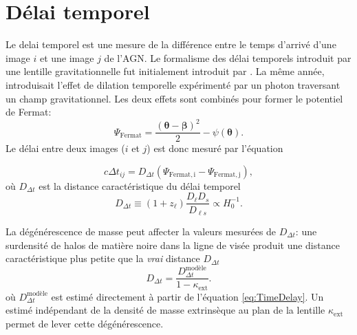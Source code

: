 \documentclass[times,10pt,twocolumn]{article}
\begin{document}

\section{Délai temporel}\label{sec:delay}
Le delai temporel est une mesure de la différence entre le temps d'arrivé d'une image $i$ 
et une image $j$ de l'AGN. Le formalisme des délai temporels introduit par une 
lentille gravitationnelle fut initialement introduit par \citet{Refsdal1964}. La même 
année, \citet{Shapiro1964} introduisait l'effet de dilation temporelle expérimenté par 
un photon traversant un champ gravitationnel. Les deux effets sont combinés pour 
former le potentiel de Fermat:
\begin{equation}\label{eq:PotentielFermat} 
        \Psi_{\mathrm{Fermat}} = \frac{(\boldsymbol{\theta} - \boldsymbol{\beta})^{2}}{2}
        - \psi(\boldsymbol{\theta}).
\end{equation} 
Le délai entre deux images ($i$ et $j$) est donc mesuré par l'équation

\begin{equation}\label{eq:TimeDelay} 
        c \Delta t_{ij} = D_{\Delta t} \left( \Psi_{\mathrm{Fermat, i}} - 
        \Psi_{\mathrm{Fermat, j}} \right),
\end{equation} 
où $D_{\Delta t}$ est la distance caractéristique du délai temporel
\begin{equation}\label{eq:Ddt} 
        D_{\Delta t} \equiv (1 + z_{\ell}) \frac{D_\ell D_s}{D_{\ell s}} \propto H_0^{-1}.
\end{equation}

La dégénérescence de masse peut affecter la valeurs mesurées de $D_{\Delta t}$: 
une surdensité de halos de matière noire dans la ligne de visée produit une 
distance caractéristique plus petite que la \textit{vrai} distance $D_{\Delta t}$
\begin{equation}\label{eq:Degenerescence} 
        D_{\Delta t} = \frac{D_{\Delta t}^{\text{modèle}}}{1 - \kappa_{\mathrm{ext}}}.
\end{equation} 
où $D_{\Delta t}^{\text{modèle}}$ est estimé directement à partir de l'équation 
\eqref{eq:TimeDelay}. Un estimé indépendant de la densité de 
masse extrinsèque au plan 
de la lentille $\kappa_{\mathrm{ext}}$ 
permet de lever cette dégénérescence.
\end{document}
